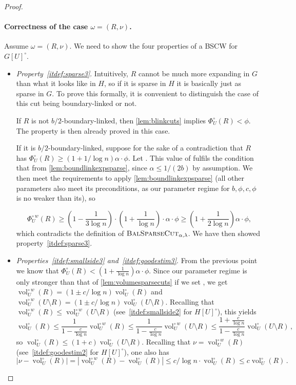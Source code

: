 \documentclass[epsfig,letter,11pt]{article}
\numberwithin{equation}{section}
\newcommand{\unvolc}[2]{\operatorname{vol}_{#2}^\circ (#1)}
\newcommand{\wvolc}[2]{\operatorname{vol}_{#2}^{\circ \,w} (#1)}
\newcommand{\unspc}[2]{\Phi_{#2}^\circ (#1)}
\newcommand{\wspc}[2]{\Phi_{#2}^{\circ \,w} (#1)}
\newcommand{\bsc}{\textsc{BalSparseCut}_{\alpha,\lambda}}
\renewcommand{\hat}{\widehat}
\begin{document}
\begin{proof}[Proof]
	\paragraph{Correctness of the case $\omega=(R,\nu)$.}
Assume $\omega=(R,\nu)$. We need to show the four properties of a BSCW for~$G[U]^\circ$.
	\begin{itemize}
		\item \textit{Property~\eqref{itdef:sparse3}}. Intuitively, $R$ cannot be much more expanding in $G$ than what it looks like in $H$, so if it is sparse in $H$ it is basically just as sparse in $G$. To prove this formally, it is convenient to distinguish the case of this cut being boundary-linked or not.
		
		If $R$ is not $b/2$-boundary-linked, then \cref{lem:blinkcuts} implies $\unspc{R}{U} < \phi$. The property is  then already proved in this case. 
		
		If it is $b/2$-boundary-linked, suppose for the sake of a contradiction that $R$ has {$\unspc{R}{U} \ge (1+{1}/{\log n})\alpha \cdot \phi$}.  Let \smash{$\hat{\phi}=(1+\frac{1}{\log n})\alpha \cdot \phi$}. This value of \smash{$\hat{\phi}$} fulfils the condition that \smash{$\hat{\phi} \le 1/b$} from \cref{lem:boundlinkexpsparse}, since $\alpha\le 1/(2b)$ by assumption. We then meet the requirements to apply \cref{lem:boundlinkexpsparse} (all other parameters also meet its preconditions, as our parameter regime for $b,\phi,c,\phi$ is no weaker than its), so
		
		\[
			\wspc{R}{U} \geq \left(1-\frac{1}{3\log n}\right)\cdot \left(1+\frac{1}{\log n}\right)\cdot\alpha \cdot \phi \geq \left(1+\frac{1}{2\log n}\right) \alpha \cdot \phi,
		\]
		which contradicts the definition of $\bsc$. We have then showed property~\eqref{itdef:sparse3}.
		
		
		
		\item \textit{Properties~\eqref{itdef:smallside3} and~\eqref{itdef:goodestim3}}. From the previous point we know that $\unspc{R}{U} <(1+\frac{1}{\log n})\alpha \cdot \phi$. Since our parameter regime is only stronger than that of \cref{lem:volumesparsecuts} if we set \smash{$\hat{\phi}=(1+\frac{1}{\log n})\alpha \cdot \phi$}, we get $\wvolc{R}{U}= (1 \pm c/\log n)\unvolc{R}{U}$ and $\wvolc{U \setminus R}{U}= (1 \pm c/\log n)\unvolc{U \setminus R}{U}$. Recalling that $\wvolc{R}{U} \le \wvolc{U\setminus R}{U}$ (see~\eqref{itdef:smallside2} for $H[U]^\circ$), this yields
		\begin{equation*}
			\unvolc{R}{U} \le \frac{1}{1-\frac{c}{\log n}} \wvolc{R}{U} \le  \frac{1}{1-\frac{c}{\log n}}\wvolc{U\setminus R}{U} \le \frac{1+\frac{c}{\log n}}{1-\frac{c}{\log n}}\unvolc{U\setminus R}{U} \, ,
		\end{equation*}
		so $\unvolc{R}{U} \le (1+c)\unvolc{U\setminus R}{U}$. Recalling that $\nu = \wvolc{R}{U}$ (see~\eqref{itdef:goodestim2} for $H[U]^\circ$), one also has
		\begin{equation*}
			\left|\nu-\unvolc{R}{U}\right|=\left|\wvolc{R}{U}-\unvolc{R}{U}\right|\le c/\log n \cdot \unvolc{R}{U} \le c \unvolc{R}{U} \, .
		\end{equation*}
		

\end{itemize}
\end{proof}
\end{document}
